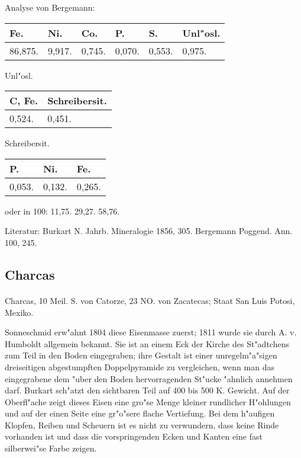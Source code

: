 \documentclass[a4paper, 11pt, oneside]{article}
\begin{document}
Analyse von Bergemann:
\begin{table}[H]
    \centering
    \begin{tabular}{l l l l l l}
        Fe. & Ni. & Co. & P. & S. & Unl"osl. \\ \hline
        86,875. & 9,917. & 0,745. & 0,070. & 0,553. & 0,975. \\
    \end{tabular}
\end{table}

\begin{center}
Unl"osl.
\end{center}

\begin{table}[H]
    \centering
    \begin{tabular}{l l}
        C, Fe. & Schreibersit. \\ \hline
        0,524. & 0,451. \\
    \end{tabular}
\end{table}

\begin{center}
Schreibersit.
\end{center}

\begin{table}[H]
    \centering
    \begin{tabular}{l l l}
        P. & Ni. & Fe. \\ \hline
        0,053. & 0,132. & 0,265. \\
    \end{tabular}
\end{table}

oder in 100: 11,75. 29,27. 58,76.

\footnotesize
Literatur: Burkart N. Jahrb. Mineralogie 1856, 305. Bergemann Poggend. Ann. 100, 245.

\subsection{Charcas}
\normalsize
\paragraph{}
Charcas, 10 Meil. S. von Catorze, 23 NO. von Zacatecas; Staat San Luis Potosi, Mexiko.

Sonneschmid erw"ahnt 1804 diese Eisenmasse zuerst; 1811 wurde sie durch A. v. Humboldt allgemein bekannt. Sie ist an einem Eck der Kirche des St"adtchens zum Teil in den Boden eingegraben; ihre Gestalt ist einer unregelm"a"sigen dreiseitigen abgestumpften Doppelpyramide zu vergleichen, wenn man das eingegrabene dem "uber den Boden hervorragenden St"ucke "ahnlich annehmen darf. Burkart sch"atzt den sichtbaren Teil auf 400 bis 500 K. Gewicht. Auf der Oberfl"ache zeigt dieses Eisen eine gro"se Menge kleiner rundlicher H"ohlungen und auf der einen Seite eine gr"o"sere flache Vertiefung. Bei dem h"aufigen Klopfen, Reiben und Scheuern ist es nicht zu verwundern, dass keine Rinde vorhanden ist und dass die vorspringenden Ecken und Kanten eine fast silberwei"se Farbe zeigen.
\end{document}
